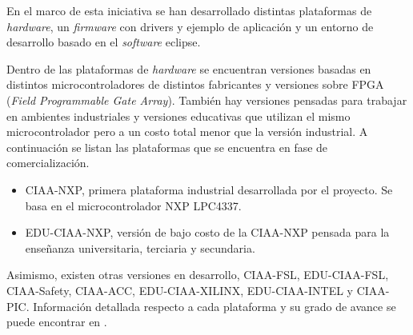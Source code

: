 En el marco de esta iniciativa se han desarrollado distintas plataformas de \textit{hardware}, un \textit{firmware} con drivers y ejemplo de aplicación y un entorno de desarrollo basado en el \textit{software} eclipse.

Dentro de las plataformas de \textit{hardware} se encuentran versiones basadas en distintos microcontroladores de distintos fabricantes y versiones sobre FPGA (\textit{Field Programmable Gate Array}).  También hay versiones pensadas para trabajar en ambientes industriales y versiones educativas que utilizan el mismo microcontrolador pero a un costo total menor que la versión industrial. 
A continuación se listan las plataformas que se encuentra en fase de comercialización.

\begin{itemize}
\item CIAA-NXP, primera plataforma industrial desarrollada por el proyecto.  Se basa en el microcontrolador NXP LPC4337. 
\item EDU-CIAA-NXP, versión de bajo costo de la CIAA-NXP pensada para la enseñanza universitaria, terciaria y secundaria. 
\end{itemize}

Asimismo, existen otras versiones en desarrollo, CIAA-FSL, EDU-CIAA-FSL, CIAA-Safety, CIAA-ACC, EDU-CIAA-XILINX, EDU-CIAA-INTEL y CIAA-PIC. Información detallada respecto a cada plataforma y su grado de avance se puede encontrar en \citep{CIAA}.


